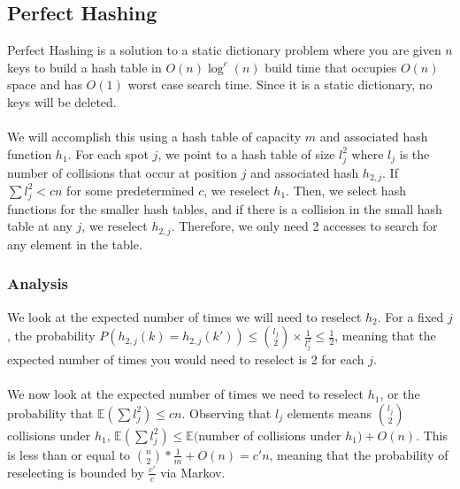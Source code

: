 \documentclass{article}
\begin{document}
\subsection*{Perfect Hashing}
Perfect Hashing is a solution to a static dictionary problem where you are given $n$ keys to build a hash table in $O(n) \log ^c (n)$ build time that occupies $O(n)$ space and has $O(1)$ worst case search time. Since it is a static dictionary, no keys will be deleted.\\
\\
We will accomplish this using a hash table of capacity $m$ and associated hash function $h_1$. For each spot $j$, we point to a hash table of size $l_j^2$ where $l_j$ is the number of collisions that occur at position $j$ and associated hash $h_{2,j}$. If $\sum l_j^2 < cn$ for some predetermined $c$, we reselect $h_1$. Then, we select hash functions for the smaller hash tables, and if there is a collision in the small hash table at any $j$, we reselect $h_{2, j}$. Therefore, we only need 2 accesses to search for any element in the table.
\subsubsection*{Analysis}
We look at the expected number of times we will need to reselect $h_2$. For a fixed $j$, the probability $P(h_{2, j}(k) = h_{2, j}(k')) \leq {l_j \choose 2} \times \frac{1}{l_j^2} \leq \frac{1}{2}$, meaning that the expected number of times you would need to reselect is 2 for each $j$.\\
\\
We now look at the expected number of times we need to reselect $h_1$, or the probability that $\mathbb{E}(\sum l_j^2) \leq c n$. Observing that $l_j$ elements means $l_j \choose 2$ collisions under $h_1$, $\mathbb{E}(\sum l_j^2) \leq \mathbb{E}($number of collisions under $h_1) + O(n)$. This is less than or equal to ${n \choose 2}*\frac{1}{m} + O(n) = c' n$, meaning that the probability of reselecting is bounded by $\frac{c'}{c}$ via Markov.
\end{document}
